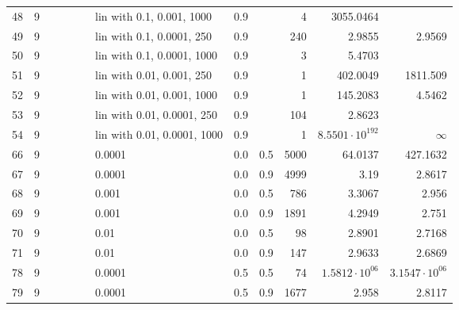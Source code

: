 \begin{longtable}{lrrrrrlrrrrr}
  48 &       9 &   &   &   &   &   lin with 0.1, 0.001, 1000 &  0.9 &        &       4 &              3055.0464 &                        \\
  49 &       9 &   &   &   &   &   lin with 0.1, 0.0001, 250 &  0.9 &        &     240 &                 2.9855 &                 2.9569 \\
  50 &       9 &   &   &   &   &  lin with 0.1, 0.0001, 1000 &  0.9 &        &       3 &                 5.4703 &                        \\
  51 &       9 &   &   &   &   &   lin with 0.01, 0.001, 250 &  0.9 &        &       1 &               402.0049 &               1811.509 \\
  52 &       9 &   &   &   &   &  lin with 0.01, 0.001, 1000 &  0.9 &        &       1 &               145.2083 &                 4.5462 \\
  53 &       9 &   &   &   &   &  lin with 0.01, 0.0001, 250 &  0.9 &        &     104 &                 2.8623 &                        \\
  54 &       9 &   &   &   &   & lin with 0.01, 0.0001, 1000 &  0.9 &        &       1 & $8.5501\cdot 10^{192}$ &               $\infty$ \\
  66 &       9 &   &   &   &   &                      0.0001 &  0.0 &    0.5 &    5000 &                64.0137 &               427.1632 \\
  67 &       9 &   &   &   &   &                      0.0001 &  0.0 &    0.9 &    4999 &                   3.19 &                 2.8617 \\
  68 &       9 &   &   &   &   &                       0.001 &  0.0 &    0.5 &     786 &                 3.3067 &                  2.956 \\
  69 &       9 &   &   &   &   &                       0.001 &  0.0 &    0.9 &    1891 &                 4.2949 &                  2.751 \\
  70 &       9 &   &   &   &   &                        0.01 &  0.0 &    0.5 &      98 &                 2.8901 &                 2.7168 \\
  71 &       9 &   &   &   &   &                        0.01 &  0.0 &    0.9 &     147 &                 2.9633 &                 2.6869 \\
  78 &       9 &   &   &   &   &                      0.0001 &  0.5 &    0.5 &      74 &  $1.5812\cdot 10^{06}$ &  $3.1547\cdot 10^{06}$ \\
  79 &       9 &   &   &   &   &                      0.0001 &  0.5 &    0.9 &    1677 &                  2.958 &                 2.8117 \\

\end{longtable}
